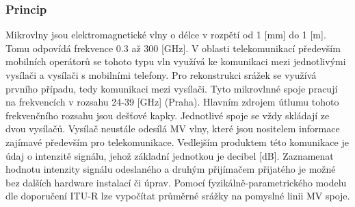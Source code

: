 \documentclass[a4paper,12pt]{article}
\begin{document}
\subsubsection{Princip}
Mikrovlny jsou elektromagnetické vlny o délce v rozpětí od 1 [mm] do 1 [m]. Tomu odpovídá frekvence 0.3  až 300 [GHz]. V oblasti telekomunikací především mobilních operátorů se tohoto typu vln využívá ke komunikaci mezi jednotlivými vysílači a vysílači s mobilními telefony. Pro rekonstrukci srážek se využívá prvního případu, tedy komunikaci mezi vysílači. Tyto mikrovlnné spoje pracují na frekvencích v rozsahu 24-39 [GHz] (Praha). Hlavním zdrojem útlumu tohoto frekvenčního rozsahu jsou dešťové kapky. Jednotlivé spoje se vždy skládají ze dvou vysílačů. Vysílač neustále odesílá MV vlny, které jsou nositelem informace zajímavé především pro telekomunikace. Vedlejším produktem této komunikace je údaj o intenzitě signálu, jehož základní jednotkou je decibel [dB]. Zaznamenat hodnotu intenzity signálu odeslaného a druhým přijímačem přijatého je možné bez dalších hardware instalací či úprav. Pomocí fyzikálně-parametrického modelu dle doporučení ITU-R\cite{itu} lze vypočítat průměrné srážky na pomyslné linii MV spoje.
\end{document}
